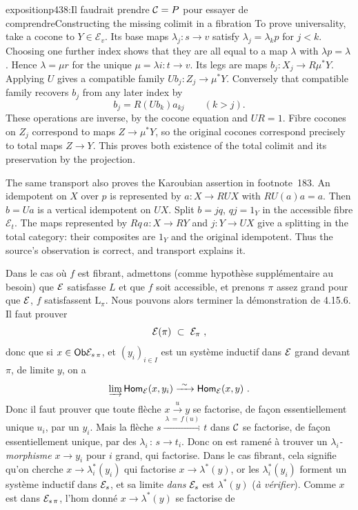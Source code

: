 \begin{dcomment}{exposition}{p438:Il faudrait prendre $\mathcal{C} = P$ pour essayer de comprendre}{Constructing the missing colimit in a fibration}
To prove universality, take a cocone to $Y\in\mathcal E_v$. Its base maps $\lambda_j:s\to v$ satisfy $\lambda_j=\lambda_kp$ for $j<k$. Choosing one further index shows that they are all equal to a map $\lambda$ with $\lambda p=\lambda$. Hence $\lambda=\mu r$ for the unique $\mu=\lambda i:t\to v$. Its legs are maps $b_j:X_j\to R\mu^*Y$. Applying $U$ gives a compatible family $Ub_j:Z_j\to\mu^*Y$. Conversely that compatible family recovers $b_j$ from any later index by
\[
 b_j=R(Ub_k)a_{kj}\qquad(k>j).
\]
These operations are inverse, by the cocone equation and $UR=1$. Fibre cocones on $Z_j$ correspond to maps $Z\to\mu^*Y$, so the original cocones correspond precisely to total maps $Z\to Y$. This proves both existence of the total colimit and its preservation by the projection.

The same transport also proves the Karoubian assertion in footnote~183. An idempotent on $X$ over $p$ is represented by $a:X\to RUX$ with $RU(a)a=a$. Then $b=Ua$ is a vertical idempotent on $UX$. Split $b=jq$, $qj=1_Y$ in the accessible fibre $\mathcal E_t$. The maps represented by $Rq\,a:X\to RY$ and $j:Y\to UX$ give a splitting in the total category: their composites are $1_Y$ and the original idempotent. Thus the source's observation is correct, and transport explains it.
\end{dcomment}


Dans le cas où $f$ est fibrant, admettons (comme hypothèse supplémentaire au besoin) que $\mathcal{E}$ satisfasse $L$ et que $f$ soit accessible, et prenons $\pi$ assez grand pour que $\mathcal{E}$, $f$ satisfassent $\mathrm{L}_{\pi}$. Nous pouvons alors terminer la démonstration de 4.15.6. Il faut prouver
\[
\mathcal{E}(\pi) \ \subset \ \mathcal{E}_{\pi} \ ,
\]
donc que si $x \in \mathsf{Ob} \mathcal{E}_{s\,\pi}$, et $(y_i)_{i \in I}$ est un système inductif dans $\mathcal{E}$ grand devant $\pi$, de limite $y$, on a
\[
\varinjlim \mathsf{Hom}_{\mathcal{E}}(x, y_i) \xrightarrow{\ \sim\ } \mathsf{Hom}_{\mathcal{E}}(x, y) \ .
\]
Donc il faut prouver que toute flèche $x \xrightarrow{u} y$ se factorise, de façon essentiellement unique $u_i$, par un $y_i$. Mais la flèche $s \xrightarrow{\ \lambda \, = \, f(u)\ } t$ dans $\mathcal{C}$ se factorise, de façon essentiellement unique, par des $\lambda_i \, : \, s \longrightarrow t_i$. Donc on est ramené à trouver un \textit{$\lambda_i$-morphisme} $x \longrightarrow y_i$ pour $i$ grand, qui factorise. Dans le cas fibrant, cela signifie qu'on cherche $x \longrightarrow \lambda^*_i(y_i)$ qui factorise $x \longrightarrow \lambda^*(y)$, or les $\lambda^*_i(y_i)$ forment un système inductif dans $\mathcal{E}_s$, et sa limite \textit{dans} $\mathcal{E}_s$ est $\lambda^*(y)$ (\textit{à vérifier}). Comme $x$ est dans $\mathcal{E}_{s\,\pi}$, l'hom donné $x \longrightarrow \lambda^*(y)$ se factorise de


